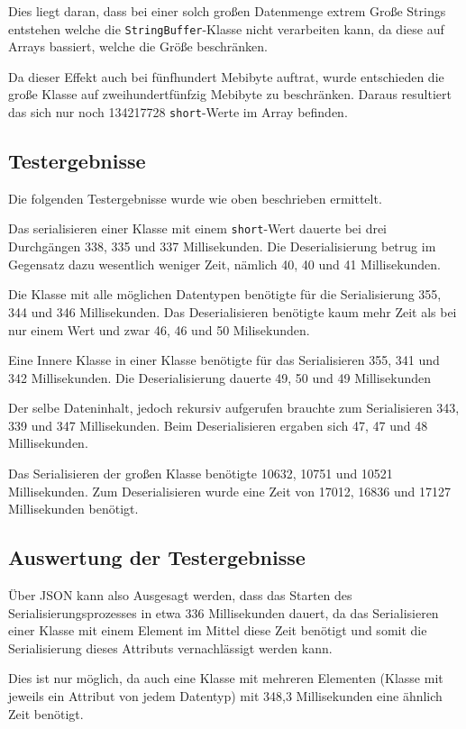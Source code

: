 Dies liegt daran, dass bei einer solch gro\ss{}en Datenmenge extrem Gro\ss{}e Strings entstehen welche die \texttt{StringBuffer}-Klasse nicht verarbeiten kann, da diese auf Arrays bassiert, welche die Gr\"o\ss{}e beschr\"anken.

Da dieser Effekt auch bei f\"unfhundert Mebibyte auftrat, wurde entschieden die gro\ss{}e Klasse auf zweihundertf\"unfzig Mebibyte zu beschr\"anken. Daraus resultiert das sich nur noch 134217728 \texttt{short}-Werte im Array befinden.

\subsection{Testergebnisse}
Die folgenden Testergebnisse wurde wie oben beschrieben ermittelt.

Das serialisieren einer Klasse mit einem \texttt{short}-Wert dauerte bei drei Durchg\"angen 338, 335 und 337 Millisekunden. Die Deserialisierung betrug im Gegensatz dazu wesentlich weniger Zeit, n\"amlich 40, 40 und 41 Millisekunden. 

Die Klasse mit alle m\"oglichen Datentypen ben\"otigte f\"ur die Serialisierung  355, 344 und 346 Millisekunden. Das Deserialisieren ben\"otigte kaum mehr Zeit als bei nur einem Wert und zwar 46, 46 und 50 Milisekunden.

Eine Innere Klasse in einer Klasse ben\"otigte f\"ur das Serialisieren 355, 341 und 342 Millisekunden. Die Deserialisierung dauerte 49, 50 und 49 Millisekunden

Der selbe Dateninhalt, jedoch rekursiv aufgerufen brauchte zum Serialisieren 343, 339 und 347 Millisekunden. Beim Deserialisieren ergaben sich 47, 47 und 48 Millisekunden.

Das Serialisieren der gro\ss{}en Klasse ben\"otigte 10632, 10751 und 10521 Millisekunden. Zum Deserialisieren wurde eine Zeit von 17012, 16836 und 17127 Millisekunden ben\"otigt.

\subsection{Auswertung der Testergebnisse}
\"Uber JSON kann also Ausgesagt werden, dass das Starten des Serialisierungsprozesses in etwa 336 Millisekunden dauert, da das Serialisieren einer Klasse mit einem Element im Mittel diese Zeit ben\"otigt und somit die Serialisierung dieses Attributs vernachl\"assigt werden kann.

Dies ist nur m\"oglich, da auch eine Klasse mit mehreren Elementen (Klasse mit jeweils ein Attribut von jedem Datentyp) mit 348,3 Millisekunden eine \"ahnlich Zeit ben\"otigt.


